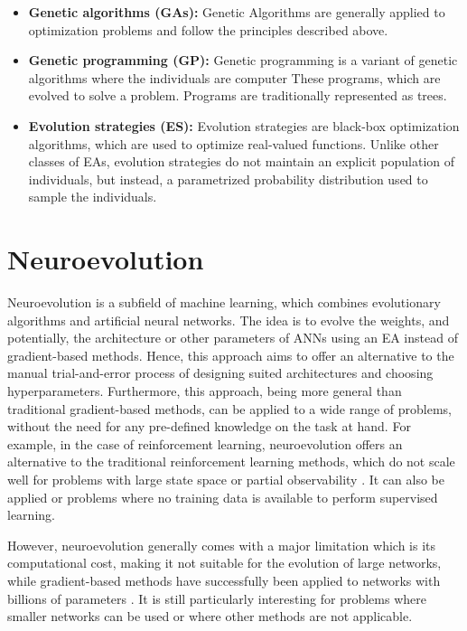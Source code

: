 \begin{itemize}
    \item \textbf{Genetic algorithms (GAs):} Genetic Algorithms \cite{genetic_alg,genetic_alg_review} are generally applied to optimization problems and follow the principles described above.
    \item \textbf{Genetic programming (GP):} Genetic programming \cite{cartesian_gp} is a variant of genetic algorithms where the individuals are computer These programs, which are evolved to
        solve a problem. Programs are traditionally represented as trees.
    \item \textbf{Evolution strategies (ES):} Evolution strategies \cite{es_intro} are black-box optimization algorithms, which are used to optimize real-valued functions.
        Unlike other classes of EAs, evolution strategies do not maintain an explicit population of individuals, but instead, a parametrized probability distribution
        used to sample the individuals.
\end{itemize}

\section{Neuroevolution}

Neuroevolution is a subfield of machine learning, which combines evolutionary algorithms and artificial neural networks. The idea is to evolve the weights,
and potentially, the architecture or other parameters of ANNs using an EA instead of gradient-based methods. Hence, this approach aims to
offer an alternative to the manual trial-and-error process of designing suited architectures and choosing hyperparameters. Furthermore, this approach,
being more general than traditional gradient-based methods, can be applied to a wide range of problems, without the need for any pre-defined knowledge on the task
at hand. For example, in the case of reinforcement learning, neuroevolution offers an alternative to the traditional reinforcement learning methods, which do not
scale well for problems with large state space or partial observability \cite{challenges_of_rl,rl_control}. It can also be applied or problems where no training
data is available to perform supervised learning.

However, neuroevolution generally comes with a major limitation which is its computational cost, making it not suitable for the evolution of large networks,
while gradient-based methods have successfully been applied to networks with billions of parameters \cite{llama3}.
It is still particularly interesting for problems where smaller networks can be used or where other methods are not applicable.


